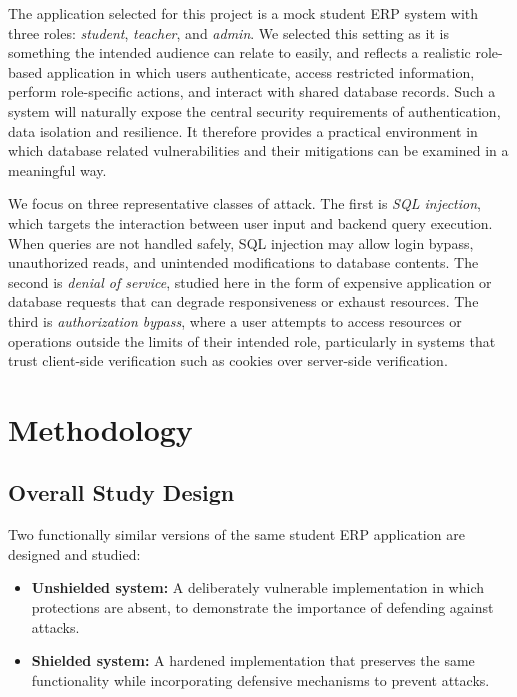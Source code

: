 \documentclass[11pt,a4paper]{article}
\begin{document}
The application selected for this project is a mock student ERP system with three roles: \textit{student}, \textit{teacher}, and \textit{admin}. We selected this setting as it is something the intended audience can relate to easily, and reflects a realistic role-based application in which users authenticate, access restricted information, perform role-specific actions, and interact with shared database records. Such a system will naturally expose the central security requirements of authentication, data isolation and resilience. It therefore provides a practical environment in which database related vulnerabilities and their mitigations can be examined in a meaningful way.

We focus on three representative classes of attack. The first is \textit{SQL injection}, which targets the interaction between user input and backend query execution. When queries are not handled safely, SQL injection may allow login bypass, unauthorized reads, and unintended modifications to database contents. The second is \textit{denial of service}, studied here in the form of expensive application or database requests that can degrade responsiveness or exhaust resources. The third is \textit{authorization bypass}, where a user attempts to access resources or operations outside the limits of their intended role, particularly in systems that trust client-side verification such as cookies over server-side verification.

\section{Methodology}

\subsection{Overall Study Design}

Two functionally similar versions of the same student ERP application are designed and studied:

\begin{itemize}
    \item \textbf{Unshielded system:} A deliberately vulnerable implementation in which protections are absent, to demonstrate the importance of defending against attacks.
    \item \textbf{Shielded system:} A hardened implementation that preserves the same functionality while incorporating defensive mechanisms to prevent attacks.
\end{itemize}
\end{document}
